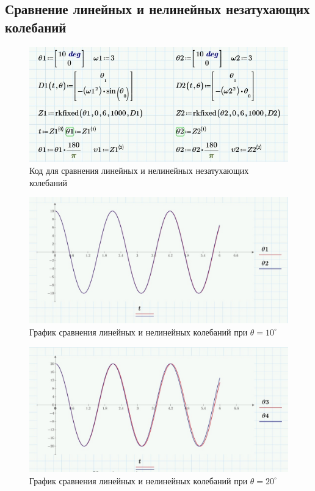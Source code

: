 \documentclass[a4paper, 14pt]{extarticle}
\begin{document}
		\subsection{Сравнение линейных и нелинейных незатухающих колебаний}		
		\begin{figure}[H]
			\centering
			\includegraphics[width = .7\linewidth]{19.jpg}
			\caption[.] {Код для сравнения линейных и нелинейных незатухающих колебаний}
		\end{figure}
		\begin{figure}[H]
			\centering
			\includegraphics[width = \linewidth]{2.jpg}
			\caption[.] {График сравнения линейных и нелинейных колебаний при $\theta = 10^{\circ}$}
		\end{figure}
		\begin{figure}[H]
			\centering
			\includegraphics[width = \linewidth]{4.jpg}
			\caption[.] {График сравнения линейных и нелинейных колебаний при $\theta = 20^{\circ}$}
		\end{figure}
\end{document}
